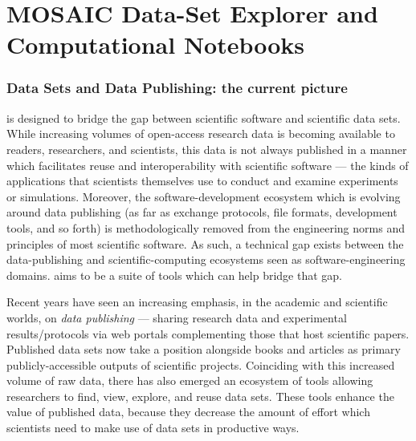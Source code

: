 \documentclass[11pt,letterpaper]{article}
\let\OldPart\part
\renewcommand{\part}[1]{\OldPart{#1}\vspace{-1.5em}}
\newcommand{\ATextCClr}[1]{\textcolor{atcColor}{\textbf{#1}}}
\newcommand{\CRtwo}{{\resizebox{!}{7.5pt}{\ATextCClr{CR2}}}}
\newcommand{\lMOSAIC}{%
\resizebox{!}{8pt}{\AcronymText{M}}%
\resizebox{!}{6pt}{\AcronymText{OSAIC}}}
\newcommand{\textscc}[1]{{\color{orr!35!black}{{%
						\fontfamily{Cabin-TLF}\fontseries{b}\selectfont{\textsc{\scriptsize{#1}}}}}}}
\newcommand{\AcronymText}[1]{{\textscc{#1}}}
\newcommand{\PDF}{\resizebox{!}{7pt}{\AcronymText{PDF}}}
\newcommand{\p}[1]{

\vspace{1em}#1}
\begin{document}
{%


\part{MOSAIC Data-Set Explorer and Computational Notebooks}


\section{Data Sets and Data Publishing: the current picture}

\p{\lMOSAIC{} is designed to bridge the 
gap between scientific software and 
scientific data sets.  While increasing 
volumes of open-access research data is 
becoming available to readers, researchers, 
and scientists, this data is not always 
published in a manner which facilitates 
reuse and interoperability with scientific 
software --- the kinds of applications 
that scientists themselves use to conduct 
and examine experiments or simulations.  
Moreover, the software-development ecosystem 
which is evolving around data publishing 
(as far as exchange protocols, file formats, 
development tools, and so forth) is  
methodologically removed from the engineering 
norms and principles of most scientific 
software.  As such, a technical gap 
exists between the data-publishing and 
scientific-computing ecosystems seen 
as software-engineering domains.  
\lMOSAIC{} aims to be a suite of tools 
which can help bridge that gap.}

\p{Recent years have seen an increasing emphasis, 
in the academic and scientific worlds, on 
\textit{data publishing} --- sharing research 
data and experimental results/protocols via 
web portals complementing those that host 
scientific papers.  Published data sets 
now take a position alongside books and articles 
as primary publicly-accessible outputs of 
scientific projects.  Coinciding with this 
increased volume of raw data, there has 
also emerged an ecosystem of tools allowing 
researchers to find, view, explore, and 
reuse data sets.  These tools enhance the 
value of published data, because they decrease 
the amount of effort which scientists need 
to make use of data sets in productive ways.}

}
\end{document}
